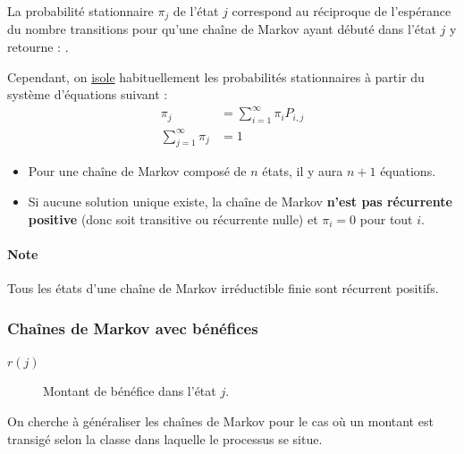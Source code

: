 \documentclass[french]{article}
\begin{document}
\begin{multicols*}{2}
\begin{definitionNOHFILLprop}
La probabilité stationnaire $\pi_{j}$ de l'état $j$ correspond au réciproque de l'espérance du nombre transitions pour qu'une chaîne de Markov ayant débuté dans l'état $j$ y retourne : .

\bigskip

Cependant, on \underline{isole} habituellement les probabilités stationnaires à partir du système d'équations suivant : 
\begin{align*}
	\pi_{j}
	&=	\sum_{i = 1}^{\infty} \pi_{i} P_{i, j}	\\
	\sum_{j = 1}^{\infty} \pi_{j}
	&=	1
\end{align*}

\begin{itemize}
	\item	Pour une chaîne de Markov composé de $n$ états, il y aura $n + 1$ équations.
	\item	Si aucune solution unique existe, la chaîne de Markov \textbf{n'est pas récurrente positive} (donc soit transitive ou récurrente nulle) et $\pi_{i} = 0$ pour tout $i$.
\end{itemize}
\end{definitionNOHFILLprop}

\paragraph{Note}	Tous les états d'une chaîne de Markov irréductible finie sont récurrent positifs.



\subsubsection{Chaînes de Markov avec bénéfices}
\begin{distributions}[Notation]
\begin{description}
	\item[$r(j)$]	Montant de bénéfice dans l'état $j$.
\end{description}
\end{distributions}

\begin{rappel_enhanced}[Contexte]
On cherche à généraliser les chaînes de Markov pour le cas où un montant est transigé selon la classe dans laquelle le processus se situe.


\end{rappel_enhanced}
\end{multicols*}
\end{document}
